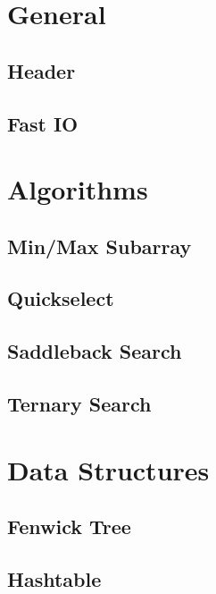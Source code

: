 \documentclass[landscape, 10pt]{article}
\begin{document}
\begin{multicols}{4}

\tableofcontents
\section{General}
\subsection{Header}

\subsection{Fast IO}


\section{Algorithms}
\subsection{Min/Max Subarray}

\subsection{Quickselect}

\subsection{Saddleback Search}

\subsection{Ternary Search}


\section{Data Structures}
\subsection{Fenwick Tree}

\subsection{Hashtable}


\end{multicols}
\end{document}
